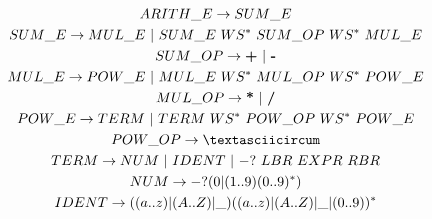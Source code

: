 \documentclass[14pt]{extarticle}
\begin{document}
\begin{enumerate}
\begin{gather*}
              ARITH\_E \to SUM\_E\\
              SUM\_E \to MUL\_E\ |\ SUM\_E\ WS^*\ SUM\_OP\ WS^*\ MUL\_E\\
              SUM\_OP \to \textbf{+}\ |\ \textbf{-}\\
              MUL\_E \to POW\_E\ |\ MUL\_E\ WS^*\ MUL\_OP\ WS^*\ POW\_E\\
              MUL\_OP \to \textbf{*}\ |\ \textbf{/}\\
              POW\_E \to TERM\ |\ TERM\ WS^*\ POW\_OP\ WS^*\ POW\_E\\
              POW\_OP \to \textasciicircum\\
              TERM \to NUM\ |\ IDENT\ |\ -?\ LBR\ EXPR\ RBR\\
              NUM \to -?(0 | (1..9) (0..9)^*)\\
              IDENT \to ((a..z) | (A..Z) | \_ ) ((a..z) | (A..Z) | \_ | (0..9)) ^ *
          \end{gather*}


\end{enumerate}
\end{document}
